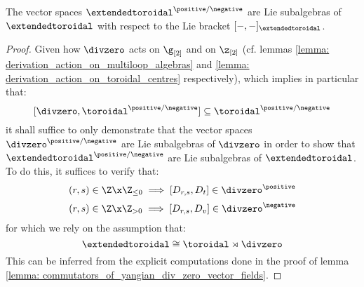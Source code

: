        \begin{lemma} \label{lemma: positive/negative_yangian_extended_toroidal_lie_algebras}
            The vector spaces $\extendedtoroidal^{\positive/\negative}$ are Lie subalgebras of $\extendedtoroidal$ with respect to the Lie bracket $[-, -]_{\extendedtoroidal}$.
        \end{lemma}
            \begin{proof}
                Given how $\divzero$ acts on $\g_{[2]}$ and on $\z_{[2]}$ (cf. lemmas \ref{lemma: derivation_action_on_multiloop_algebras} and \ref{lemma: derivation_action_on_toroidal_centres} respectively), which implies in particular that:
                    $$[\divzero, \toroidal^{\positive/\negative}] \subseteq \toroidal^{\positive/\negative}$$
                it shall suffice to only demonstrate that the vector spaces $\divzero^{\positive/\negative}$ are Lie subalgebras of $\divzero$ in order to show that $\extendedtoroidal^{\positive/\negative}$ are Lie subalgebras of $\extendedtoroidal$. To do this, it suffices to verify that:
                    $$(r, s) \in \Z \x \Z_{\leq 0} \implies [D_{r, s}, D_t] \in \divzero^{\positive}$$
                    $$(r, s) \in \Z \x \Z_{> 0} \implies [D_{r, s}, D_v] \in \divzero^{\negative}$$
                for which we rely on the assumption that:
                    $$\extendedtoroidal \cong \toroidal \rtimes \divzero$$
                This can be inferred from the explicit computations done in the proof of lemma \ref{lemma: commutators_of_yangian_div_zero_vector_fields}.
            \end{proof}


